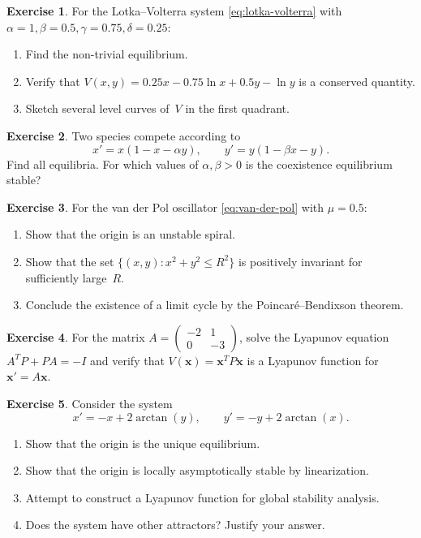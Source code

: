 \documentclass[12pt,a4paper,openany]{book}
\theoremstyle{definition}
\newtheorem{exercise}{Exercise}[chapter]
\theoremstyle{plain}
\theoremstyle{remark}
\begin{document}
\begin{exercise}
\label{exo:lotka-volterra-exercise}
For the Lotka--Volterra system \eqref{eq:lotka-volterra} with
\(\alpha=1,\beta=0.5,\gamma=0.75,\delta=0.25\):
\begin{enumerate}[label=(\alph*)]
  \item Find the non-trivial equilibrium.
  \item Verify that \(V(x,y)=0.25x-0.75\ln x+0.5y-\ln y\) is a conserved
    quantity.
  \item Sketch several level curves of~\(V\) in the first quadrant.
\end{enumerate}
\end{exercise}

\begin{exercise}
\label{exo:linearize-compete}
Two species compete according to
\[
  x' = x(1-x-\alpha y), \qquad y' = y(1-\beta x - y).
\]
Find all equilibria. For which values of \(\alpha,\beta>0\) is the coexistence
equilibrium stable?
\end{exercise}

\begin{exercise}
\label{exo:van-der-pol-exercise}
For the van der Pol oscillator \eqref{eq:van-der-pol} with \(\mu=0.5\):
\begin{enumerate}[label=(\alph*)]
  \item Show that the origin is an unstable spiral.
  \item Show that the set \(\{(x,y): x^2+y^2\le R^2\}\) is positively
    invariant for sufficiently large~\(R\).
  \item Conclude the existence of a limit cycle by the Poincar\'e--Bendixson
    theorem.
\end{enumerate}
\end{exercise}

\begin{exercise}
\label{exo:lyapunov-equation}
For the matrix \(A=\begin{pmatrix}-2&1\\0&-3\end{pmatrix}\), solve the
Lyapunov equation \(A^TP+PA=-I\) and verify that
\(V(\mathbf{x})=\mathbf{x}^TP\mathbf{x}\) is a Lyapunov function for
\(\mathbf{x}'=A\mathbf{x}\).
\end{exercise}

\begin{exercise}
\label{exo:global-stability}
Consider the system
\[
  x' = -x + 2\arctan(y), \qquad y' = -y + 2\arctan(x).
\]
\begin{enumerate}[label=(\alph*)]
  \item Show that the origin is the unique equilibrium.
  \item Show that the origin is locally asymptotically stable by linearization.
  \item Attempt to construct a Lyapunov function for global stability analysis.
  \item Does the system have other attractors? Justify your answer.
\end{enumerate}
\end{exercise}
\end{document}
